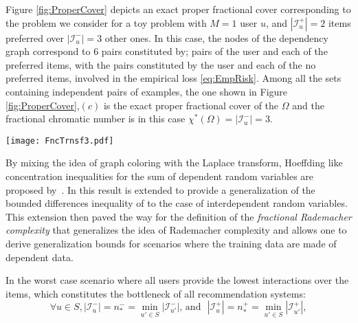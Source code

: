 \documentclass[10pt,journal,compsoc]{IEEEtran}
\newcommand{\itemS}{\mathcal{I}}
\newcommand{\graph}{\Omega}
\begin{document}
\begin{sloppypar}
Figure \ref{fig:ProperCover} depicts an exact proper fractional cover corresponding to the problem we consider for a toy problem with $M=1$ user $u$, and $|\itemS^+_u|=2$ items preferred over $|\itemS^-_u|=3$ other ones. In this case, the nodes of the dependency graph correspond to $6$ pairs constituted by; pairs of the user and each of the preferred items, with the pairs constituted by the user and each of the no preferred items, involved in the empirical loss \eqref{eq:EmpRisk}. Among all the sets containing independent pairs of examples, the one shown in Figure \ref{fig:ProperCover},$(c)$ is the exact proper fractional cover of the $\graph$ and the fractional chromatic number is in this case $\chi^*(\graph)=|\itemS^-_u|=3$.
\begin{figure*}[t!]
\begin{center}
\texttt{[image: FncTrnsf3.pdf]}
\end{center}\vspace{-5mm}
\caption{A toy problem with 1 user who prefers $|\itemS_u^+|=2$ items over $|\itemS_u^-|=3$ other ones (top). The dyadic representation of pairs constituted with the representation of the user and each of the representations of preferred and non-preferred items (middle). Different covering of the dependent set, $(a)$ and $(b)$; as well as the exact proper fractional cover, $(c)$, corresponding to the smallest disjoint sets containing independent pairs.}
\label{fig:ProperCover}
\end{figure*}

By mixing the idea of graph coloring with the Laplace transform, Hoeffding like concentration inequalities for the sum of dependent random variables are proposed by~\cite{Janson04RSA}. In \cite{UsunierAG05} this result is extended to provide a generalization of the bounded differences inequality of \cite{mcdiarmid89method} to the case of interdependent random variables. This extension then paved the way for the definition of the {\em fractional Rademacher complexity} that generalizes the idea of Rademacher complexity and allows one to derive generalization bounds for scenarios where the training
data are made of dependent data.

In the worst case scenario where all users provide the lowest interactions over the items, which constitutes the bottleneck of all recommendation systems:
\[
\forall u\in S, |\itemS^-_u|=n_*^-=\mathop{\min}_{u'\in S} |\itemS^-_{u'}| \text{,~and~~} |\itemS^+_u|=n_*^+=\mathop{\min}_{u'\in S} |\itemS^+_{u'}|,
\]


\end{sloppypar}
\end{document}
